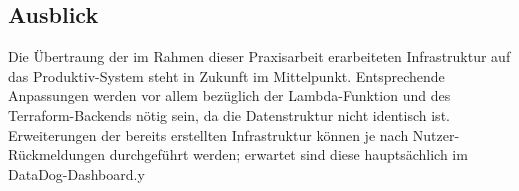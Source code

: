 \subsection{Ausblick}
Die Übertraung der im Rahmen dieser Praxisarbeit erarbeiteten Infrastruktur auf das Produktiv-System steht in Zukunft im Mittelpunkt. Entsprechende Anpassungen werden vor allem bezüglich der Lambda-Funktion und des Terraform-Backends nötig sein, da die Datenstruktur nicht identisch ist. Erweiterungen der bereits erstellten Infrastruktur können je nach Nutzer-Rückmeldungen durchgeführt werden; erwartet sind diese hauptsächlich im DataDog-Dashboard.y